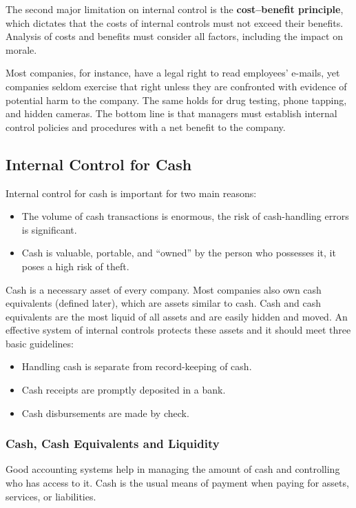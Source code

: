 \documentclass[../main.tex]{subfiles}
\begin{document}
	The second major limitation on internal control is the \textbf{cost–benefit 
	principle}, which dictates that the costs of internal controls must not 
	exceed their benefits. Analysis of costs and benefits must consider all 
	factors, including the impact on morale. 
	
	Most companies, for instance, have 
	a legal right to read employees’ e-mails, yet companies seldom exercise 
	that right unless they are confronted with evidence of potential harm to 
	the company. The same holds for drug testing, phone tapping, and hidden 
	cameras. The bottom line is that managers must establish internal control 
	policies and procedures with a net benefit to the company.
	
	\subsection{Internal Control for Cash}
	
	Internal control for cash is important for two main reasons:
	\begin{itemize}[noitemsep]
		\item The volume of cash transactions is enormous, the risk of 
		cash-handling errors is significant.
		\item Cash is valuable, portable, and “owned” by the person who 
		possesses it, it poses a high risk of theft.
	\end{itemize}

	Cash is a necessary asset of every company. Most companies also own cash 
	equivalents (defined later), which are assets similar to cash. Cash and 
	cash equivalents are the most liquid of all assets and are easily hidden 
	and moved. An effective system of internal controls protects these assets 
	and it should meet three basic guidelines:
	\begin{itemize}[noitemsep]
		\item Handling cash is separate from record-keeping of cash.
		\item Cash receipts are promptly deposited in a bank.
		\item Cash disbursements are made by check.
	\end{itemize}
	
	\subsubsection{Cash, Cash Equivalents and Liquidity}
	
	Good accounting systems help in managing the amount of cash and controlling 
	who has access to it. Cash is the usual means of payment when paying for 
	assets, services, or liabilities. 
	
\end{document}
